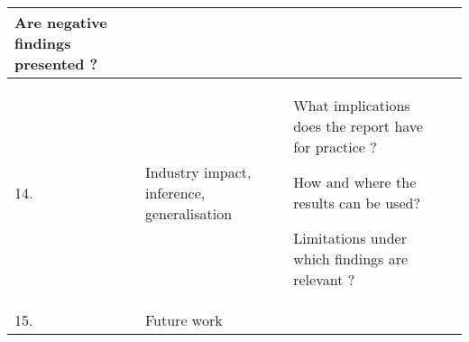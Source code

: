 {\begin{tabular}{|>{\raggedright}p{}|>{\raggedright}p{}|>{\raggedright}p{}|>{\raggedright}p{}|}
Are negative findings presented \citep{Kitchenham2007}? & \tabularnewline
\hline 
14. & Industry impact, inference, generalisation & What implications does the report have for practice \citep{Kitchenham2007}?

How and where the results can be used?

Limitations under which findings are relevant \citep{Jedlitschka2005}? & \tabularnewline
\hline 
15. & Future work &  & \tabularnewline
\hline

\end{tabular}
} %
